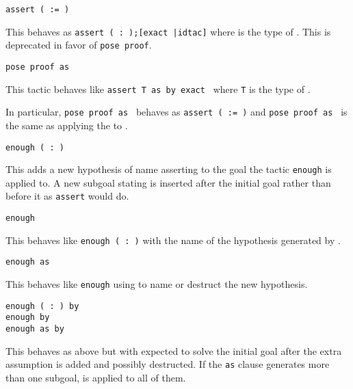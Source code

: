 \begin{coq_example*}
\begin{Variants}
\item{\tt assert ( {\ident} := {\term} )}

  This behaves as {\tt assert ({\ident} :\ {\type});[exact
      {\term}|idtac]} where {\type} is the type of {\term}. This is
  deprecated in favor of {\tt pose proof}.

  \ErrMsg {}

\item \texttt{pose proof {\term} as {\intropattern}}

  This tactic behaves like \texttt{assert T as {\intropattern} by
  exact {\term}} where \texttt{T} is the type of {\term}.

  In particular, \texttt{pose proof {\term} as {\ident}} behaves as
  \texttt{assert ({\ident} := {\term})} and \texttt{pose proof {\term}
    as {\intropattern}} is the same as applying
  the {\intropattern} to {\term}.

\item \texttt{enough ({\ident} :\ {\form})}

  This adds a new hypothesis of name {\ident} asserting {\form} to the
  goal the tactic \texttt{enough} is applied to. A new subgoal stating
  \texttt{\form} is inserted after the initial goal rather than before
  it as \texttt{assert} would do.

\item \texttt{enough {\form}}

  This behaves like \texttt{enough ({\ident} :\ {\form})} with the name
  {\ident} of the hypothesis generated by {\Coq}.

\item \texttt{enough {\form} as {\intropattern}}

  This behaves like \texttt{enough} {\form} using {\intropattern} to
  name or destruct the new hypothesis.

\item \texttt{enough ({\ident} :\ {\form}) by {\tac}}\\
 \texttt{enough {\form} by {\tac}}\\
 \texttt{enough {\form} as {\intropattern} by {\tac}}

  This behaves as above but with {\tac} expected to solve the initial
  goal after the extra assumption {\form} is added and possibly
  destructed. If the \texttt{as} {\intropattern} clause generates more
  than one subgoal, {\tac} is applied to all of them.


\end{Variants}
\end{coq_example*}
